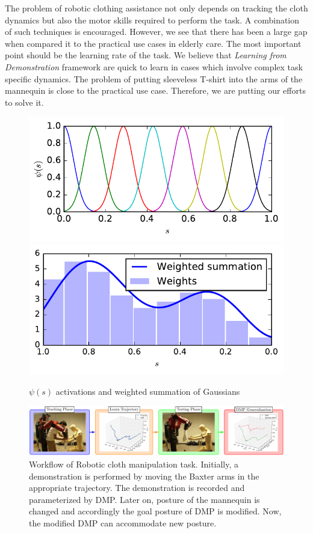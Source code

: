 \documentclass[sigconf]{acmart}
\begin{document}
The problem of robotic clothing assistance not only depends on tracking the cloth dynamics but also the motor skills required to perform the task. A combination of such techniques is encouraged. However, we see that there has been a large gap when compared it to the practical use cases in elderly care. The most important point should be the learning rate of the task. We believe that \textit{Learning from Demonstration} framework are quick to learn in cases which involve complex task specific dynamics. The problem of putting sleeveless T-shirt into the arms of the mannequin is close to the practical use case. Therefore, we are putting our efforts to solve it.

\begin{figure}
	\includegraphics[width=\linewidth]{gaussian_kernels}
	\includegraphics[width=\linewidth]{weighted_summation}
	\caption{$\psi(s)$ activations and weighted summation of Gaussians}
	\label{fig:psi_activations}
\end{figure}

\begin{figure}
	\includegraphics[width=\linewidth]{flowchart_conf}
	\caption{Workflow of Robotic cloth manipulation task. Initially, a demonstration is performed by moving the Baxter arms in the appropriate trajectory. The demonstration is recorded and parameterized by DMP. Later on, posture of the mannequin is changed and accordingly the goal posture of DMP is modified. Now, the modified DMP can accommodate new posture.}
	\label{fig:workflow}
\end{figure}
\end{document}
